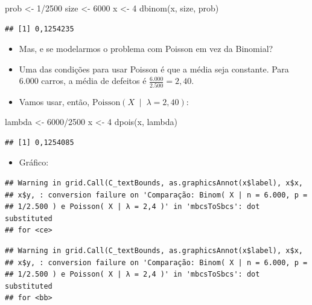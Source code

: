 \documentclass[
  11pt]{report}
\newenvironment{Shaded}{\begin{snugshade}}{\end{snugshade}}
\newcommand{\DecValTok}[1]{\textcolor[rgb]{0.00,0.00,0.81}{#1}}
\newcommand{\FunctionTok}[1]{\textcolor[rgb]{0.00,0.00,0.00}{#1}}
\newcommand{\NormalTok}[1]{#1}
\newcommand{\OtherTok}[1]{\textcolor[rgb]{0.56,0.35,0.01}{#1}}
\newcommand{\SpecialCharTok}[1]{\textcolor[rgb]{0.00,0.00,0.00}{#1}}
\providecommand{\tightlist}{%
  \setlength{\itemsep}{0pt}\setlength{\parskip}{0pt}}
\renewenvironment{Shaded}{
    \begin{mdframed}[%
      roundcorner=2pt,%
      innerleftmargin=5pt,%
      innerrightmargin=5pt,%
      topline=true,%
      leftline=true,%
      rightline=true,%
      bottomline=true,%
      linewidth=0.5pt,%
      linecolor=black!20,%
      backgroundcolor=black!2,%
      skipabove=2ex,%
      skipbelow=2.5ex%
    ]%
  }
  {
    \end{mdframed}
  }
\begin{document}
\begin{Shaded}
\begin{Highlighting}[]
\NormalTok{prob }\OtherTok{\textless{}{-}} \DecValTok{1}\SpecialCharTok{/}\DecValTok{2500}
\NormalTok{size }\OtherTok{\textless{}{-}} \DecValTok{6000}
\NormalTok{x }\OtherTok{\textless{}{-}} \DecValTok{4}
\FunctionTok{dbinom}\NormalTok{(x, size, prob)}
\end{Highlighting}
\end{Shaded}

\begin{verbatim}
## [1] 0,1254235
\end{verbatim}

\begin{itemize}
\item
  Mas, e se modelarmos o problema com Poisson em vez da Binomial?
\item
  Uma das condições para usar Poisson é que a média seja constante. Para $6.000$ carros, a média de defeitos é $\frac{6.000}{2.500} = 2{,}40$.
\item
  Vamos usar, então, $\text{Poisson}\left(X \;\middle\vert\; \lambda = 2{,}40 \right)$:
\end{itemize}

\begin{Shaded}
\begin{Highlighting}[]
\NormalTok{lambda }\OtherTok{\textless{}{-}} \DecValTok{6000}\SpecialCharTok{/}\DecValTok{2500}
\NormalTok{x }\OtherTok{\textless{}{-}} \DecValTok{4}
\FunctionTok{dpois}\NormalTok{(x, lambda)}
\end{Highlighting}
\end{Shaded}

\begin{verbatim}
## [1] 0,1254085
\end{verbatim}

\begin{itemize}
\tightlist
\item
  Gráfico:
\end{itemize}

\begin{verbatim}
## Warning in grid.Call(C_textBounds, as.graphicsAnnot(x$label), x$x,
## x$y, : conversion failure on 'Comparação: Binom( X | n = 6.000, p =
## 1/2.500 ) e Poisson( X | λ = 2,4 )' in 'mbcsToSbcs': dot substituted
## for <ce>
\end{verbatim}

\begin{verbatim}
## Warning in grid.Call(C_textBounds, as.graphicsAnnot(x$label), x$x,
## x$y, : conversion failure on 'Comparação: Binom( X | n = 6.000, p =
## 1/2.500 ) e Poisson( X | λ = 2,4 )' in 'mbcsToSbcs': dot substituted
## for <bb>
\end{verbatim}
\end{document}
